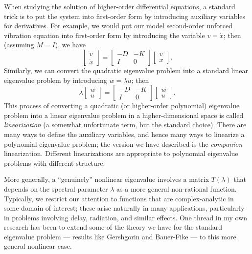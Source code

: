 \documentclass[12pt, leqno]{article} %
\begin{document}
When studying the solution of higher-order differential equations,
a standard trick is to put the system into first-order form by
introducing auxiliary variables for derivatives.  For example,
we would put our model second-order unforced vibration equation
into first-order form by introducing the variable $v = \dot{x}$;
then (assuming $M = I$), we have
\[
  \begin{bmatrix} \dot{v} \\ \dot{x} \end{bmatrix} =
  \begin{bmatrix} -D & -K \\ I & 0 \end{bmatrix}
  \begin{bmatrix} v \\ x \end{bmatrix}.
\]
Similarly, we can convert the quadratic eigenvalue problem into
a standard linear eigenvalue problem by introducing $w = \lambda u$;
then
\[
  \lambda \begin{bmatrix} w \\ u \end{bmatrix} =
  \begin{bmatrix} -D & -K \\ I & 0 \end{bmatrix}
  \begin{bmatrix} w \\ u \end{bmatrix}.
\]
This process of converting a quadratic (or higher-order polynomial)
eigenvalue problem into a linear eigenvalue problem in a higher-dimensional
space is called {\em linearization} (a somewhat unfortunate term, but the
standard choice).  There are many ways to define the auxiliary variables,
and hence many ways to linearize a polynomial eigenvalue problem; the version
we have described is the {\em companion} linearization.  Different
linearizations are appropriate to polynomial eigenvalue problems with
different structure.

More generally, a ``genuinely'' nonlinear eigenvalue involves
a matrix $T(\lambda)$ that depends on the spectral parameter $\lambda$
as a more general non-rational function.  Typically, we restrict our
attention to functions that are complex-analytic in some domain of
interest; these arise naturally in many applications, particularly
in problems involving delay, radiation, and similar effects.  One
thread in my own research has been to extend some of the theory we
have for the standard eigenvalue problem --- results like Gershgorin
and Bauer-Fike --- to this more general nonlinear case.
\end{document}
